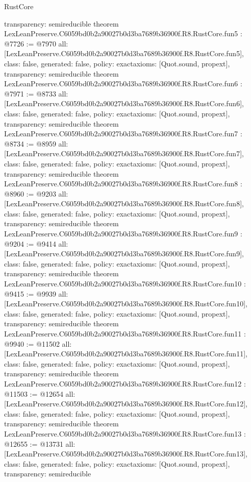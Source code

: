 \begin{lexlean}{RustCore}
\begin{coremodule}
{  transparency: semireducible
}
theorem LexLeanPreserve.C6059bd0b2a90027b0d3ba7689b36900f.R8.RustCore.fun5 : @7726 := @7970 {
  all: [LexLeanPreserve.C6059bd0b2a90027b0d3ba7689b36900f.R8.RustCore.fun5],
  class: false,
  generated: false,
  policy: exact{axioms: [Quot.sound, propext]},
  transparency: semireducible
}
theorem LexLeanPreserve.C6059bd0b2a90027b0d3ba7689b36900f.R8.RustCore.fun6 : @7971 := @8733 {
  all: [LexLeanPreserve.C6059bd0b2a90027b0d3ba7689b36900f.R8.RustCore.fun6],
  class: false,
  generated: false,
  policy: exact{axioms: [Quot.sound, propext]},
  transparency: semireducible
}
theorem LexLeanPreserve.C6059bd0b2a90027b0d3ba7689b36900f.R8.RustCore.fun7 : @8734 := @8959 {
  all: [LexLeanPreserve.C6059bd0b2a90027b0d3ba7689b36900f.R8.RustCore.fun7],
  class: false,
  generated: false,
  policy: exact{axioms: [Quot.sound, propext]},
  transparency: semireducible
}
theorem LexLeanPreserve.C6059bd0b2a90027b0d3ba7689b36900f.R8.RustCore.fun8 : @8960 := @9203 {
  all: [LexLeanPreserve.C6059bd0b2a90027b0d3ba7689b36900f.R8.RustCore.fun8],
  class: false,
  generated: false,
  policy: exact{axioms: [Quot.sound, propext]},
  transparency: semireducible
}
theorem LexLeanPreserve.C6059bd0b2a90027b0d3ba7689b36900f.R8.RustCore.fun9 : @9204 := @9414 {
  all: [LexLeanPreserve.C6059bd0b2a90027b0d3ba7689b36900f.R8.RustCore.fun9],
  class: false,
  generated: false,
  policy: exact{axioms: [Quot.sound, propext]},
  transparency: semireducible
}
theorem LexLeanPreserve.C6059bd0b2a90027b0d3ba7689b36900f.R8.RustCore.fun10 : @9415 := @9939 {
  all: [LexLeanPreserve.C6059bd0b2a90027b0d3ba7689b36900f.R8.RustCore.fun10],
  class: false,
  generated: false,
  policy: exact{axioms: [Quot.sound, propext]},
  transparency: semireducible
}
theorem LexLeanPreserve.C6059bd0b2a90027b0d3ba7689b36900f.R8.RustCore.fun11 : @9940 := @11502 {
  all: [LexLeanPreserve.C6059bd0b2a90027b0d3ba7689b36900f.R8.RustCore.fun11],
  class: false,
  generated: false,
  policy: exact{axioms: [Quot.sound, propext]},
  transparency: semireducible
}
theorem LexLeanPreserve.C6059bd0b2a90027b0d3ba7689b36900f.R8.RustCore.fun12 : @11503 := @12654 {
  all: [LexLeanPreserve.C6059bd0b2a90027b0d3ba7689b36900f.R8.RustCore.fun12],
  class: false,
  generated: false,
  policy: exact{axioms: [Quot.sound, propext]},
  transparency: semireducible
}
theorem LexLeanPreserve.C6059bd0b2a90027b0d3ba7689b36900f.R8.RustCore.fun13 : @12655 := @13731 {
  all: [LexLeanPreserve.C6059bd0b2a90027b0d3ba7689b36900f.R8.RustCore.fun13],
  class: false,
  generated: false,
  policy: exact{axioms: [Quot.sound, propext]},
  transparency: semireducible
}
\end{coremodule}
\end{lexlean}
